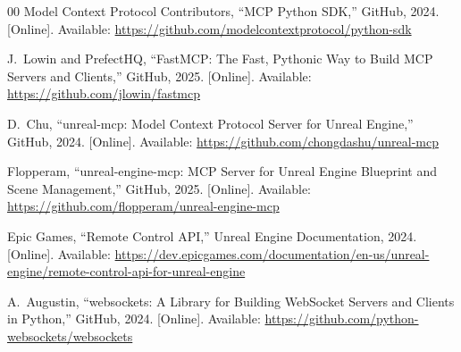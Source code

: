 \documentclass[conference]{IEEEtran}
\begin{document}
\begin{thebibliography}{00}
Model Context Protocol Contributors, ``MCP Python SDK,'' GitHub, 2024. [Online]. Available: \url{https://github.com/modelcontextprotocol/python-sdk}

J.~Lowin and PrefectHQ, ``FastMCP: The Fast, Pythonic Way to Build MCP Servers and Clients,'' GitHub, 2025. [Online]. Available: \url{https://github.com/jlowin/fastmcp}

D.~Chu, ``unreal-mcp: Model Context Protocol Server for Unreal Engine,'' GitHub, 2024. [Online]. Available: \url{https://github.com/chongdashu/unreal-mcp}

Flopperam, ``unreal-engine-mcp: MCP Server for Unreal Engine Blueprint and Scene Management,'' GitHub, 2025. [Online]. Available: \url{https://github.com/flopperam/unreal-engine-mcp}

Epic Games, ``Remote Control API,'' Unreal Engine Documentation, 2024. [Online]. Available: \url{https://dev.epicgames.com/documentation/en-us/unreal-engine/remote-control-api-for-unreal-engine}

A.~Augustin, ``websockets: A Library for Building WebSocket Servers and Clients in Python,'' GitHub, 2024. [Online]. Available: \url{https://github.com/python-websockets/websockets}

\end{thebibliography}
\end{document}
